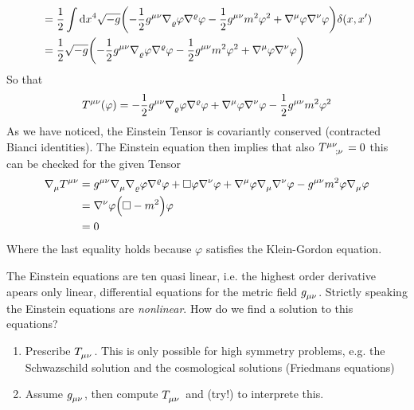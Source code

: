 \begin{example}
\begin{equation}
\begin{split}
&=\frac{1}{2}\int \dif x^4
\sqrt{-g}\left(-\frac{1}{2}\tensor{g}{^\mu^\nu}\tensor{\nabla}{_\varrho}\varphi\tensor{\nabla}{^\varrho}\varphi-\frac{1}{2}\tensor{g}{^\mu^\nu}m^2\varphi^2
+\tensor{\nabla}{^\mu}\varphi\tensor{\nabla}{^\nu}\varphi\right)\delta(x,x')\\
&=\frac{1}{2}\sqrt{-g}\left(-\frac{1}{2}\tensor{g}{^\mu^\nu}\tensor{\nabla}{_\varrho}\varphi\tensor{\nabla}{^\varrho}\varphi-\frac{1}{2}\tensor{g}{^\mu^\nu}m^2\varphi^2
+\tensor{\nabla}{^\mu}\varphi\tensor{\nabla}{^\nu}\varphi\right)
\end{split}
\end{equation}
So that
\begin{equation}
\tensor{T}{^\mu^\nu}(\varphi)
=-\frac{1}{2}\tensor{g}{^\mu^\nu}\tensor{\nabla}{_\varrho}\varphi\tensor{\nabla}{^\varrho}\varphi
+\tensor{\nabla}{^\mu}\varphi\tensor{\nabla}{^\nu}\varphi
-\frac{1}{2}\tensor{g}{^\mu^\nu}m^2\varphi^2
\end{equation}
As we have noticed, the Einstein Tensor is covariantly conserved (contracted
Bianci identities). The Einstein equation then implies that also
$\tensor{T}{^\mu^\nu_{;\nu}}=0$ this can be checked for the given Tensor
\begin{equation}
\begin{split}
\tensor{\nabla}{_\mu}\tensor{T}{^\mu^\nu}
&=\tensor{g}{^\mu^\nu}\tensor{\nabla}{_\mu}\tensor{\nabla}{_\varrho}\varphi\tensor{\nabla}{^\varrho}\varphi+\square\varphi\tensor{\nabla}{^\nu}\varphi+\tensor{\nabla}{^\mu}\varphi\tensor{\nabla}{_\mu}\tensor{\nabla}{^\nu}\varphi
-\tensor{g}{^\mu^\nu}m^2\varphi\tensor{\nabla}{_\mu}\varphi\\
&=\tensor{\nabla}{^\nu}\varphi\left(\square-m^2\right)\varphi\\
&=0
\end{split}
\end{equation}
Where the last equality holds because $\varphi$ satisfies the Klein-Gordon
equation. 
\end{example}
The Einstein equations are ten quasi linear, i.e. the highest order
derivative apears only linear, differential equations for the metric field
$\tensor{g}{_\mu_\nu}$. Strictly speaking the Einstein equations are
\emph{nonlinear}.
How do we find a solution to this equations?
\begin{enumerate}
  \item Prescribe $\tensor{T}{_\mu_\nu}$. This is only possible for high
  symmetry problems, e.g. the Schwazschild solution and the cosmological
  solutions (Friedmans equations)
  \item Assume $\tensor{g}{_\mu_\nu}$, then compute $\tensor{T}{_\mu_\nu}$ and
  (try!) to interprete this.
\end{enumerate}

